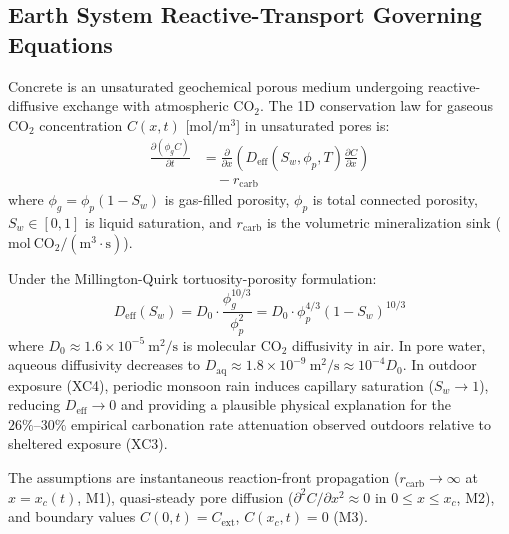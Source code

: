 \documentclass[journal]{IEEEtran}
\begin{document}
\subsection{Earth System Reactive-Transport Governing Equations}
Concrete is an unsaturated geochemical porous medium undergoing reactive-diffusive exchange with atmospheric $\mathrm{CO}_2$. The 1D conservation law for gaseous $\mathrm{CO}_2$ concentration $C(x,t)$ [$\mathrm{mol/m^3}$] in unsaturated pores is:
\begin{equation}
\begin{aligned}
\frac{\partial (\phi_g C)}{\partial t}
&= \frac{\partial}{\partial x} \left( D_{\mathrm{eff}}(S_w, \phi_p, T) \frac{\partial C}{\partial x} \right) \\
&\quad - r_{\mathrm{carb}}
\end{aligned}
\label{eq:pde_transport}
\end{equation}
where $\phi_g = \phi_p (1 - S_w)$ is gas-filled porosity, $\phi_p$ is total connected porosity, $S_w \in [0,1]$ is liquid saturation, and $r_{\mathrm{carb}}$ is the volumetric mineralization sink ($\mathrm{mol\ CO_2 / (m^3\cdot s)}$).

Under the Millington-Quirk tortuosity-porosity formulation:
\begin{equation}
D_{\mathrm{eff}}(S_w) = D_0 \cdot \frac{\phi_g^{10/3}}{\phi_p^2} = D_0 \cdot \phi_p^{4/3} (1 - S_w)^{10/3}
\label{eq:millington_quirk}
\end{equation}
where $D_0 \approx 1.6 \times 10^{-5}\ \mathrm{m^2/s}$ is molecular $\mathrm{CO}_2$ diffusivity in air. In pore water, aqueous diffusivity decreases to $D_{\mathrm{aq}} \approx 1.8 \times 10^{-9}\ \mathrm{m^2/s} \approx 10^{-4} D_0$. In outdoor exposure (XC4), periodic monsoon rain induces capillary saturation ($S_w \to 1$), reducing $D_{\mathrm{eff}} \to 0$ and providing a plausible physical explanation for the $26\%\text{--}30\%$ empirical carbonation rate attenuation observed outdoors relative to sheltered exposure (XC3).

The assumptions are instantaneous reaction-front propagation ($r_{\mathrm{carb}} \to \infty$ at $x = x_c(t)$, M1), quasi-steady pore diffusion ($\partial^2 C / \partial x^2 \approx 0$ in $0 \le x \le x_c$, M2), and boundary values $C(0,t) = C_{\mathrm{ext}}$, $C(x_c, t) = 0$ (M3).
\end{document}
